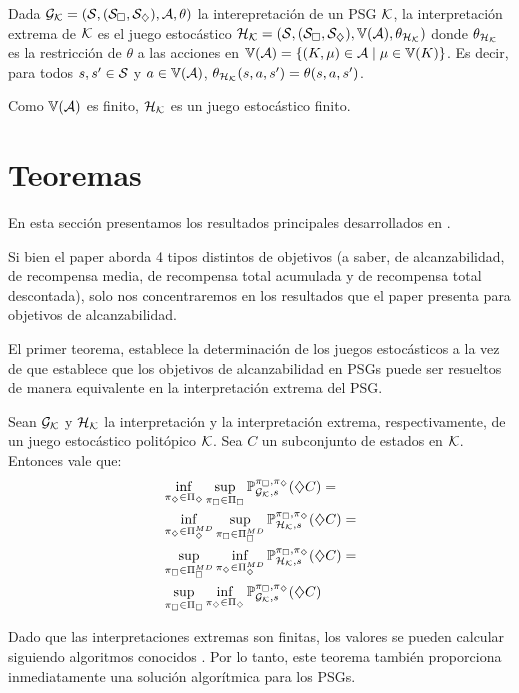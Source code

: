 \begin{definition}
	Dada $\mathcal{G}_{\mathcal{K}} = (\mathcal{S}, (\mathcal{S}_\square, \mathcal{S}_\diamondsuit), \mathcal{A}, \theta)$ la interepretación de un PSG $\mathcal{K}$, la interpretación extrema de $\mathcal{K}$ es el juego estocástico $\mathcal{H}_{\mathcal{K}} = (\mathcal{S}, (\mathcal{S}_\square, \mathcal{S}_\diamondsuit), \mathbb{V}(\mathcal{A}), \theta_{\mathcal{H}_{\mathcal{K}}})$ donde $\theta_{\mathcal{H}_{\mathcal{K}}}$ es la restricción de  $\theta$ a las acciones en $\mathbb{V}(\mathcal{A}) = \{(K, \mu) \in \mathcal{A} \mid \mu \in \mathbb{V}(K)\}$. Es decir, para todos $s, s' \in \mathcal{S}$ y $a \in \mathbb{V}(\mathcal{A})$, $\theta_{\mathcal{H}_{\mathcal{K}}}(s, a, s') = \theta(s, a, s')$.

	Como $\mathbb{V}(\mathcal{A})$ es finito, $\mathcal{H}_{\mathcal{K}}$ es un juego estocástico finito.
\end{definition}

\section{Teoremas}

En esta sección presentamos los resultados principales desarrollados en
\cite{Polytopal}.

Si bien el paper aborda 4 tipos distintos de objetivos (a saber, de
alcanzabilidad, de recompensa media, de recompensa total acumulada y de
recompensa total descontada), solo nos concentraremos en los resultados que el
paper presenta para objetivos de alcanzabilidad.

El primer teorema, establece la determinación de los juegos estocásticos a la
vez de que establece que los objetivos de alcanzabilidad en PSGs puede ser
resueltos de manera equivalente en la interpretación extrema del PSG.

\begin{theorem}
	Sean $\mathcal{G}_{\mathcal{K}}$ y $\mathcal{H}_{\mathcal{K}}$ la interpretación y la interpretación extrema, respectivamente, de un juego estocástico politópico $\mathcal{K}$. Sea $C$ un subconjunto de estados en $\mathcal{K}$. Entonces vale que:
	\begin{align*}
		&\inf_{\pi_\diamondsuit \in \Pi_\diamondsuit} \sup_{\pi_\square \in \Pi_\square} \mathbb{P}_{\mathcal{G}_{\mathcal{K}}, s}^{\pi_\square, \pi_\diamondsuit}(\diamondsuit C) = \\
		&\inf_{\pi_\diamondsuit \in \Pi_\diamondsuit^{MD}} \sup_{\pi_\square \in \Pi_\square^{MD}} \mathbb{P}_{\mathcal{H}_{\mathcal{K}}, s}^{\pi_\square, \pi_\diamondsuit}(\diamondsuit C) = \\
		&\sup_{\pi_\square \in \Pi_\square^{MD}} \inf_{\pi_\diamondsuit \in \Pi_\diamondsuit^{MD}} \mathbb{P}_{\mathcal{H}_{\mathcal{K}}, s}^{\pi_\square, \pi_\diamondsuit}(\diamondsuit C) = \\
		&\sup_{\pi_\square \in \Pi_\square} \inf_{\pi_\diamondsuit \in \Pi_\diamondsuit} \mathbb{P}_{\mathcal{G}_{\mathcal{K}}, s}^{\pi_\square, \pi_\diamondsuit}(\diamondsuit C)
	\end{align*}
\end{theorem}

Dado que las interpretaciones extremas son finitas, los valores se pueden
calcular siguiendo algoritmos conocidos \cite{CONDON1992,filar}. Por lo tanto,
este teorema también proporciona inmediatamente una solución algorítmica para
los PSGs.

